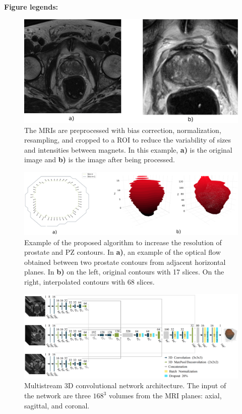 \newpage
\textbf{Figure legends:}
\begin{figure}[ht]
    \centering
    \includegraphics[totalheight=.25\textheight]{figures/Figure1.eps}
    \caption{The MRIs are preprocessed with bias correction, normalization, resampling, and cropped to a ROI to reduce the variability of sizes and intensities between magnets. In this example, \textbf{a)} is the original image and \textbf{b)} is the image after being processed.} 
    \label{fig_1}
\end{figure}

\begin{figure}[ht]
    \centering
    \includegraphics[totalheight=.21\textheight]{figures/Figure2.eps}
    \caption{Example of the proposed algorithm to increase the resolution of prostate and PZ contours. In \textbf{a)}, an example of the optical flow obtained between two prostate contours from adjacent horizontal planes. In \textbf{b)} on the left, original contours with 17 slices. On the right, interpolated contours with 68 slices.}
    \label{fig:fig_2}
\end{figure}

\begin{figure}[ht]
    \centering
    \includegraphics[totalheight=.282\textheight]{figures/Figure3.eps}
    \caption{Multistream 3D convolutional network architecture. The input of the network are three $168^3$ volumes from the MRI planes: axial, sagittal, and coronal. }
    \label{fig:fig_3}
\end{figure}

